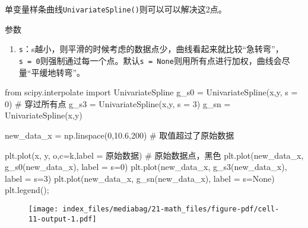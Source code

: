\documentclass[
  letterpaper,
  DIV=11,
  numbers=noendperiod]{scrreprt}
\newenvironment{Shaded}{\begin{snugshade}}{\end{snugshade}}
\newcommand{\CommentTok}[1]{\textcolor[rgb]{0.37,0.37,0.37}{#1}}
\newcommand{\DecValTok}[1]{\textcolor[rgb]{0.68,0.00,0.00}{#1}}
\newcommand{\FloatTok}[1]{\textcolor[rgb]{0.68,0.00,0.00}{#1}}
\newcommand{\ImportTok}[1]{\textcolor[rgb]{0.00,0.46,0.62}{#1}}
\newcommand{\NormalTok}[1]{\textcolor[rgb]{0.00,0.23,0.31}{#1}}
\newcommand{\OperatorTok}[1]{\textcolor[rgb]{0.37,0.37,0.37}{#1}}
\newcommand{\StringTok}[1]{\textcolor[rgb]{0.13,0.47,0.30}{#1}}
\providecommand{\tightlist}{%
  \setlength{\itemsep}{0pt}\setlength{\parskip}{0pt}}\usepackage{longtable,booktabs,array}
\begin{document}
单变量样条曲线\texttt{UnivariateSpline()}则可以可以解决这2点。

参数

\begin{enumerate}
\def\labelenumi{\arabic{enumi}.}
\tightlist
\item
  \texttt{s}：s越小，则平滑的时候考虑的数据点少，曲线看起来就比较``急转弯''，\texttt{s\ =\ 0}则强制通过每一个点。默认\texttt{s\ =\ None}则用所有点进行加权，曲线会尽量``平缓地转弯''。
\end{enumerate}

\begin{Shaded}
\begin{Highlighting}[]
\ImportTok{from}\NormalTok{ scipy.interpolate }\ImportTok{import}\NormalTok{ UnivariateSpline}
\NormalTok{g\_s0 }\OperatorTok{=}\NormalTok{ UnivariateSpline(x,y, s }\OperatorTok{=} \DecValTok{0}\NormalTok{) }\CommentTok{\# 穿过所有点}
\NormalTok{g\_s3 }\OperatorTok{=}\NormalTok{ UnivariateSpline(x,y, s }\OperatorTok{=} \DecValTok{3}\NormalTok{)}
\NormalTok{g\_sn }\OperatorTok{=}\NormalTok{ UnivariateSpline(x,y)}
\end{Highlighting}
\end{Shaded}

\begin{Shaded}
\begin{Highlighting}[]
\NormalTok{new\_data\_x }\OperatorTok{=}\NormalTok{ np.linspace(}\DecValTok{0}\NormalTok{,}\FloatTok{10.6}\NormalTok{,}\DecValTok{200}\NormalTok{) }\CommentTok{\# 取值超过了原始数据}

\NormalTok{plt.plot(x, y, }\StringTok{\textquotesingle{}o\textquotesingle{}}\NormalTok{,c}\OperatorTok{=}\StringTok{\textquotesingle{}k\textquotesingle{}}\NormalTok{,label }\OperatorTok{=} \StringTok{\textquotesingle{}原始数据\textquotesingle{}}\NormalTok{) }\CommentTok{\# 原始数据点，黑色}
\NormalTok{plt.plot(new\_data\_x, g\_s0(new\_data\_x), label }\OperatorTok{=} \StringTok{\textquotesingle{}s=0\textquotesingle{}}\NormalTok{) }
\NormalTok{plt.plot(new\_data\_x, g\_s3(new\_data\_x), label }\OperatorTok{=} \StringTok{\textquotesingle{}s=3\textquotesingle{}}\NormalTok{) }
\NormalTok{plt.plot(new\_data\_x, g\_sn(new\_data\_x), label }\OperatorTok{=} \StringTok{\textquotesingle{}s=None\textquotesingle{}}\NormalTok{) }
\NormalTok{plt.legend()}\OperatorTok{;}
\end{Highlighting}
\end{Shaded}

\begin{figure}[H]

{\centering \texttt{[image: index\_files/mediabag/21-math\_files/figure-pdf/cell-11-output-1.pdf]}

}

\end{figure}
\end{document}
